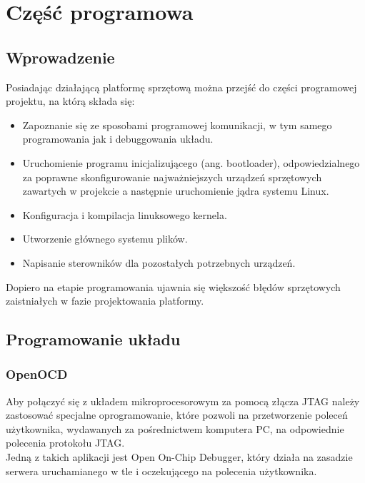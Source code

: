 \documentclass[a4paper,12pt]{book}
\begin{document}

	\chapter{Część programowa}
		\section{Wprowadzenie}
			Posiadając działającą platformę sprzętową można przejść do części programowej projektu, na którą składa się:
			\begin{itemize}
				\item Zapoznanie się ze sposobami programowej komunikacji, w tym samego programowania jak i debuggowania układu.
				\item Uruchomienie programu inicjalizującego (ang. bootloader), odpowiedzialnego za poprawne skonfigurowanie najważniejszych urządzeń sprzętowych zawartych w projekcie a następnie uruchomienie jądra systemu Linux.
				\item Konfiguracja i kompilacja linuksowego kernela.
				\item Utworzenie głównego systemu plików.
				\item Napisanie sterowników dla pozostałych potrzebnych urządzeń.
			\end{itemize}
			Dopiero na etapie programowania ujawnia się większość błędów sprzętowych zaistniałych w fazie projektowania platformy.
		\section{Programowanie układu}
		
			\subsection{OpenOCD}
				Aby połączyć się z układem mikroprocesorowym za pomocą złącza JTAG należy zastosować specjalne oprogramowanie, które pozwoli na przetworzenie poleceń użytkownika, wydawanych za pośrednictwem komputera PC, na odpowiednie polecenia protokołu JTAG.\\
				Jedną z takich aplikacji jest Open On-Chip Debugger\cite{website:openocd}, który działa na zasadzie serwera uruchamianego w tle i oczekującego na polecenia użytkownika.
\end{document}
